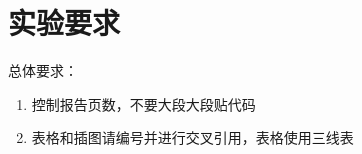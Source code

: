 \setlength{\headheight}{12.64723pt}
\addtolength{\topmargin}{-0.64723pt}
\section{实验要求}

总体要求：

\begin{enumerate}
    \item 控制报告页数，不要大段大段贴代码
    \item 表格和插图请编号并进行交叉引用，表格使用三线表
\end{enumerate}





